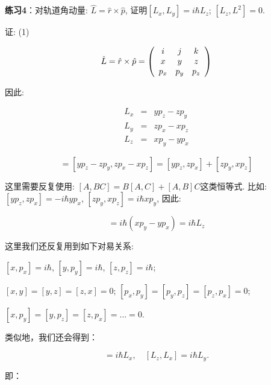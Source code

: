\textbf{练习4}：对轨道角动量: $\hat L = \hat r \times \hat p$, 证明$[L_x, L_y] = i\hbar L_z$; $[L_z, L^2]=0$.

证: (1)

\begin{equation*}
\hat L = \hat r \times \hat p = \left( {\begin{array}{*{20}c}
   i & j & k  \\
   x & y & z  \\
   {p_x } & {p_y } & {p_z }  \\
 \end{array} } \right)
\end{equation*}

因此:

\begin{eqnarray*}
  L_x &=& yp_z - zp_y \\
  L_y &=& zp_x-xp_z \\
  L_z &=& xp_y - yp_x
\end{eqnarray*}

\begin{equation*}
[L_x, L_y] = [yp_z - zp_y, zp_x-xp_z]= [yp_z, zp_x] + [zp_y, xp_z]
\end{equation*}

这里需要反复使用: $[A, BC] = B[A,C]+ [A,B]C$这类恒等式. 比如:
$[yp_z, zp_x] =-i\hbar  y p_x$, $[zp_y, xp_z] = i\hbar x p_y$, 因此:

\begin{equation*}
[L_x, L_y] = i\hbar (x p_y - y p_x)=i\hbar L_z
\end{equation*}

这里我们还反复用到如下对易关系:

$[x, p_x]=i\hbar$, $[y, p_y]=i\hbar$, $[z, p_z]=i\hbar$;

$[x,y]=[y,z]=[z,x]=0$; $[p_x,p_y]=[p_y,p_z]=[p_z,p_x]=0$;

$[x, p_y]=[y,p_z]=[z,p_x]=...=0$.

类似地，我们还会得到：

\begin{equation*}
[L_y, L_z] =i\hbar L_x,  \quad [L_z, L_x] =i\hbar L_y. 
\end{equation*}

即：

